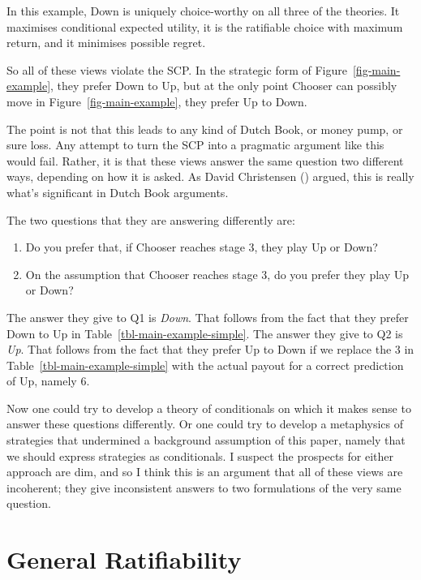 \documentclass[
  11pt,
  letterpaper,
  DIV=11,
  numbers=noendperiod,
  twoside]{scrartcl}
\providecommand{\tightlist}{%
  \setlength{\itemsep}{0pt}\setlength{\parskip}{0pt}}
\begin{document}
In this example, Down is uniquely choice-worthy on all three of the
theories. It maximises conditional expected utility, it is the
ratifiable choice with maximum return, and it minimises possible regret.

So all of these views violate the SCP. In the strategic form of
Figure~\ref{fig-main-example}, they prefer Down to Up, but at the only
point Chooser can possibly move in Figure~\ref{fig-main-example}, they
prefer Up to Down.

The point is not that this leads to any kind of Dutch Book, or money
pump, or sure loss. Any attempt to turn the SCP into a pragmatic
argument like this would fail. Rather, it is that these views answer the
same question two different ways, depending on how it is asked. As David
Christensen () argued, this is
really what's significant in Dutch Book arguments.

The two questions that they are answering differently are:

\begin{enumerate}
\def\labelenumi{\arabic{enumi}.}
\tightlist
\item
  Do you prefer that, if Chooser reaches stage 3, they play Up or Down?
\item
  On the assumption that Chooser reaches stage 3, do you prefer they
  play Up or Down?
\end{enumerate}

The answer they give to Q1 is \emph{Down}. That follows from the fact
that they prefer Down to Up in Table~\ref{tbl-main-example-simple}. The
answer they give to Q2 is \emph{Up}. That follows from the fact that
they prefer Up to Down if we replace the 3 in
Table~\ref{tbl-main-example-simple} with the actual payout for a correct
prediction of Up, namely 6.

Now one could try to develop a theory of conditionals on which it makes
sense to answer these questions differently. Or one could try to develop
a metaphysics of strategies that undermined a background assumption of
this paper, namely that we should express strategies as conditionals. I
suspect the prospects for either approach are dim, and so I think this
is an argument that all of these views are incoherent; they give
inconsistent answers to two formulations of the very same question.

\section{General Ratifiability}\label{sec-general-ratify}
\end{document}
